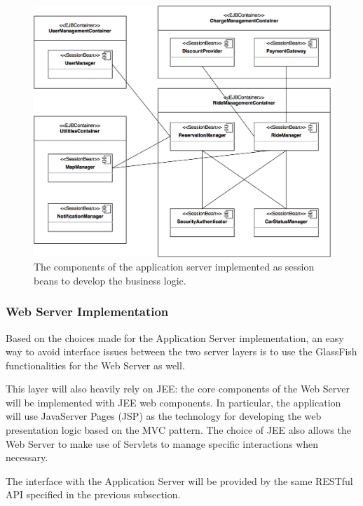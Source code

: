 \begin{figure}[H]
\begin{center}
		\includegraphics[width=\textwidth]{./arch_design/diagrams/app_server_comps.png}
		\caption{The components of the application server implemented as session beans to develop the business logic.}
		\label{app_server_comps}
\end{center}
\end{figure}

\subsubsection{Web Server Implementation}
Based on the choices made for the Application Server implementation, an easy way to avoid interface issues between the two server layers is to use the GlassFish functionalities for the Web Server as well.

This layer will also heavily rely on JEE: the core components of the Web Server will be implemented with JEE web components. In particular, the application will use JavaServer Pages (JSP) as the technology for developing the web presentation logic based on the MVC pattern. The choice of JEE also allows the Web Server to make use of Servlets to manage specific interactions when necessary.

The interface with the Application Server will be provided by the same RESTful API specified in the previous subsection.

